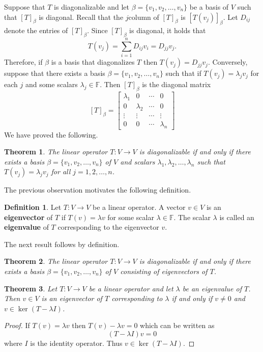 \documentclass[12pt]{article}
\newcommand{\tv}{T:V\rightarrow V}
\newtheorem{theorem}{Theorem}[section]
\theoremstyle{definition}
\newtheorem{definition}{Definition}[section]
\begin{document}
Suppose that $T$ is diagonalizable and let $\beta=\{v_1,v_2,\ldots,v_n\}$ be a basis of $V$ such that $[T]_\beta$ is diagonal.  Recall that the $j$column of $[T]_\beta$ is $[T(v_j)]_\beta$.  Let $D_{ij}$ denote the entries of $[T]_\beta$.  Since $[T]_\beta$ is diagonal, it holds that
\[
T(v_j) = \sum_{i=1}^n D_{ij} v_i = D_{jj} v_j.
\]
Therefore, if $\beta$ is a basis that diagonalizes $T$ then $T(v_j) = D_{jj} v_j$.  Conversely, suppose that there exists a basis $\beta=\{v_1,v_2,\ldots,v_n\}$ such that if $T(v_j) = \lambda_j v_j$ for each $j$ and some scalars $\lambda_j\in\mathbb{F}$.  Then $[T]_\beta$ is the diagonal matrix
\[
[T]_\beta = \begin{bmatrix} \lambda_1 & 0 & \cdots & 0\\ 0 & \lambda_2 & \cdots & 0\\ \vdots & \vdots & \cdots & \vdots\\ 0 & 0 & \cdots & \lambda_n\end{bmatrix}
\]
We have proved the following.
\begin{theorem}
The linear operator $\tv$ is diagonalizable if and only if there exists a basis $\beta=\{v_1,v_2,\ldots,v_n\}$ of $V$ and scalars $\lambda_1,\lambda_2,\ldots,\lambda_n$ such that $T(v_j) = \lambda_j v_j$ for all $j=1,2,\ldots,n$.
\end{theorem}
The previous observation motivates the following definition.
\begin{definition}
Let $\tv$ be a linear operator.  A vector $v\in V$ is an \textbf{eigenvector} of $T$ if $T(v) = \lambda v$ for some scalar $\lambda\in\mathbb{F}$.  The scalar $\lambda$ is called an \textbf{eigenvalue} of $T$ corresponding to the eigenvector $v$.
\end{definition}
The next result follows by definition.
\begin{theorem}
The linear operator $\tv$ is diagonalizable if and only if there exists a basis $\beta=\{v_1,v_2,\ldots,v_n\}$ of $V$ consisting of eigenvectors of $T$. 
\end{theorem}

\begin{theorem}
Let $\tv$ be a linear operator and let $\lambda$ be an eigenvalue of $T$.  Then $v\in V$ is an eigenvector of $T$ corresponding to $\lambda$ if and only if $v\neq 0$ and $v\in\ker(T-\lambda I)$.
\end{theorem}
\begin{proof}
If $T(v) = \lambda v$ then $T(v) - \lambda v = 0$ which can be written as
\[
(T-\lambda I) v = 0
\]
where $I$ is the identity operator.  Thus $v\in\ker(T-\lambda I)$.
\end{proof}
\end{document}
